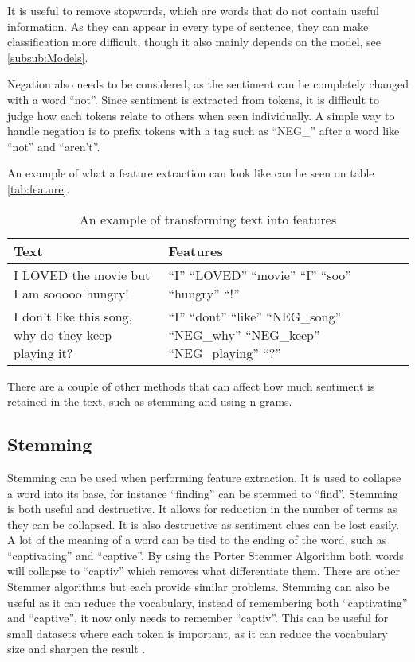 It is useful to remove stopwords, which are words that do not contain useful
information. As they can appear in every type of sentence, they can make
classification more difficult, though it also mainly depends on the model,
see \autoref{subsub:Models}.\nl

Negation also needs to be considered, as the sentiment can be completely changed
with a word ``not''. Since sentiment is extracted from tokens, it is difficult
to judge how each tokens relate to others when seen individually. A simple way
to handle negation is to prefix tokens with a tag such as ``NEG\_'' after a
word like ``not'' and ``aren't''.\nl

An example of what a feature extraction can look like can be seen on table
\autoref{tab:feature}.

\begin{table}[H]
\centering
\begin{tabular}{|p{6cm}|p{8cm}|}
\hline
Text & Features \\ \hline
I LOVED the movie but I am sooooo hungry! & 
``I'' ``LOVED'' ``movie'' ``I'' ``soo'' ``hungry'' ``!''
\\ \hline 
I don't like this song, why do they keep playing it? &
``I'' ``dont'' ``like'' ``NEG\_song'' ``NEG\_why'' ``NEG\_keep'' ``NEG\_playing''
``?'' \\ \hline
\end{tabular}
\caption{An example of transforming text into features}
\label{tab:feature}
\end{table}

There are a couple of other methods that can affect how much sentiment is
retained in the text, such as stemming and using n-grams.

\subsection{Stemming}
Stemming can be used when performing feature extraction. It is used to collapse
a word into its base, for instance ``finding'' can be stemmed to ``find''.
Stemming is both useful and destructive. It allows for reduction in the number
of terms as they can be collapsed. It is also destructive as sentiment clues
can be lost easily. A lot of the meaning of a word can be tied to the ending of
the word, such as ``captivating'' and ``captive''. By using the Porter Stemmer
Algorithm both words will collapse to ``captiv'' which removes what
differentiate them. There are other Stemmer algorithms but each provide similar
problems. Stemming can also be useful as it can reduce the vocabulary, instead
of remembering both ``captivating'' and ``captive'', it now only needs to
remember ``captiv''. This can be useful for small datasets where each token is
important, as it can reduce the vocabulary size and sharpen the result
\citep[Ch 3.b]{Sentiment}.

